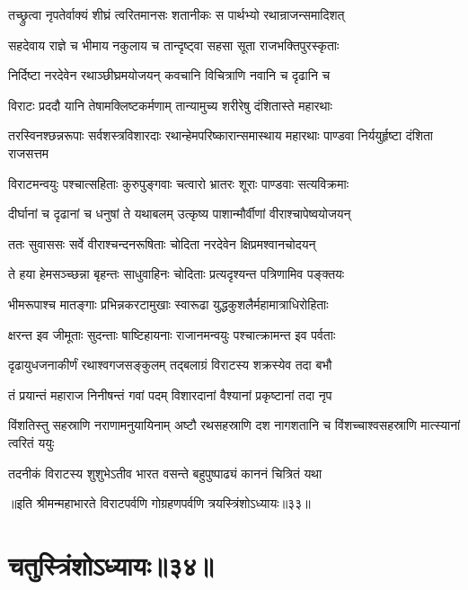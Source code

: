
\twolineshloka
{तच्छ्रुत्वा नृपतेर्वाक्यं शीघ्रं त्वरितमानसः}
{शतानीकः स पार्थभ्यो रथान्राजन्समादिशत्}


\twolineshloka
{सहदेवाय राज्ञे च भीमाय नकुलाय च}
{तान्दृष्ट्वा सहसा सूता राजभक्तिपुरस्कृताः}


\twolineshloka
{निर्दिष्टा नरदेवेन रथाञ्छीघ्रमयोजयन्}
{कवचानि विचित्राणि नवानि च दृढानि च}


\twolineshloka
{विराटः प्रददौ यानि तेषामक्लिष्टकर्मणाम्}
{तान्यामुच्य शरीरेषु दंशितास्ते महारथाः}


\threelineshloka
{तरस्विनश्छन्नरूपाः सर्वशस्त्रविशारदाः}
{रथान्हेमपरिष्कारान्समास्थाय महारथाः}
{पाण्डवा निर्ययुर्हृष्टा दंशिता राजसत्तम}


\twolineshloka
{विराटमन्वयुः पश्चात्सहिताः कुरुपुङ्गवाः}
{चत्वारो भ्रातरः शूराः पाण्डवाः सत्यविक्रमाः}


\twolineshloka
{दीर्घानां च दृढानां च धनुषां ते यथाबलम्}
{उत्कृष्य पाशान्मौर्वीणां वीराश्चापेष्वयोजयन्}


\twolineshloka
{ततः सुवाससः सर्वे वीराश्चन्दनरूषिताः}
{चोदिता नरदेवेन क्षिप्रमश्वानचोदयन्}


\twolineshloka
{ते हया हेमसञ्च्छन्ना बृहन्तः साधुवाहिनः}
{चोदिताः प्रत्यदृश्यन्त पत्रिणामिव पङ्क्तयः}


\twolineshloka
{भीमरूपाश्च मातङ्गाः प्रभिन्नकरटामुखाः}
{स्वारूढा युद्धकुशलैर्महामात्राधिरोहिताः}


\twolineshloka
{क्षरन्त इव जीमूताः सुदन्ताः षाष्टिहायनाः}
{राजानमन्वयुः पश्चात्क्रामन्त इव पर्वताः}


\twolineshloka
{दृढायुधजनाकीर्णं रथाश्वगजसङ्कुलम्}
{तद्बलाग्रं विराटस्य शक्रस्येव तदा बभौ}


\twolineshloka
{तं प्रयान्तं महाराज निनीषन्तं गवां पदम्}
{विशारदानां वैश्यानां प्रकृष्टानां तदा नृप}


\threelineshloka
{विंशतिस्तु सहस्राणि नराणामनुयायिनाम्}
{अष्टौ रथसहस्राणि दश नागशतानि च}
{विंशच्चाश्वसहस्राणि मात्स्यानां त्वरितं ययुः}


\twolineshloka
{तदनीकं विराटस्य शुशुभेऽतीव भारत}
{वसन्ते बहुपुष्पाढ्यं काननं चित्रितं यथा}

॥इति श्रीमन्महाभारते विराटपर्वणि गोग्रहणपर्वणि त्रयस्त्रिंशोऽध्यायः॥३३॥

\chapter{चतुस्त्रिंशोऽध्यायः॥३४॥}


